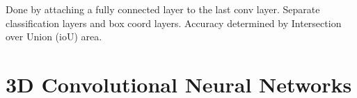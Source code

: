 \documentclass[honours,12pt]{unswthesis}
\numberwithin{equation}{section}
\begin{document}
Done by attaching a fully connected layer to the last conv layer. Separate classification layers and box coord layers. 
Accuracy determined by Intersection over Union (ioU) area. 




\section{3D Convolutional Neural Networks}\label{3dConvNeuralNets}










\clearpage




\end{document}
